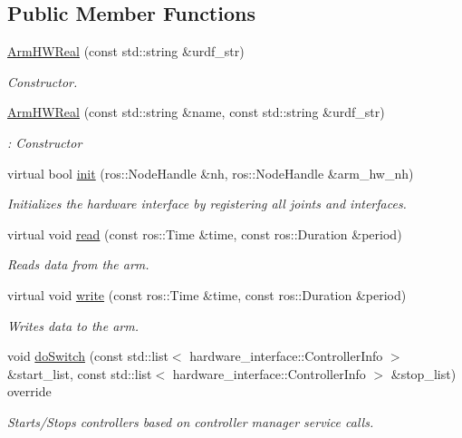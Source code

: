 \subsection*{Public Member Functions}
\begin{DoxyCompactItemize}
\item 
\hyperlink{classuwrt_1_1arm_1_1_arm_h_w_real_ad7edcfcf86fd221726402cbbf0f7a6d3}{Arm\+H\+W\+Real} (const std\+::string \&urdf\+\_\+str)
\begin{DoxyCompactList}\small\item\em Constructor. \end{DoxyCompactList}\item 
\hyperlink{classuwrt_1_1arm_1_1_arm_h_w_real_aa79a19f491094474cb91e6a07eecf0ee}{Arm\+H\+W\+Real} (const std\+::string \&name, const std\+::string \&urdf\+\_\+str)
\begin{DoxyCompactList}\small\item\em \+: Constructor \end{DoxyCompactList}\item 
virtual bool \hyperlink{classuwrt_1_1arm_1_1_arm_h_w_real_ab2556fef8e4666cb970113130e21a690}{init} (ros\+::\+Node\+Handle \&nh, ros\+::\+Node\+Handle \&arm\+\_\+hw\+\_\+nh)
\begin{DoxyCompactList}\small\item\em Initializes the hardware interface by registering all joints and interfaces. \end{DoxyCompactList}\item 
virtual void \hyperlink{classuwrt_1_1arm_1_1_arm_h_w_real_a7a4704f71c0652269a2e9c10907ca8b1}{read} (const ros\+::\+Time \&time, const ros\+::\+Duration \&period)
\begin{DoxyCompactList}\small\item\em Reads data from the arm. \end{DoxyCompactList}\item 
virtual void \hyperlink{classuwrt_1_1arm_1_1_arm_h_w_real_a25ab702964a8b1db7ea58b040189b820}{write} (const ros\+::\+Time \&time, const ros\+::\+Duration \&period)
\begin{DoxyCompactList}\small\item\em Writes data to the arm. \end{DoxyCompactList}\item 
void \hyperlink{classuwrt_1_1arm_1_1_arm_h_w_real_a5bc11742cda0b7826e45a12217c89965}{do\+Switch} (const std\+::list$<$ hardware\+\_\+interface\+::\+Controller\+Info $>$ \&start\+\_\+list, const std\+::list$<$ hardware\+\_\+interface\+::\+Controller\+Info $>$ \&stop\+\_\+list) override
\begin{DoxyCompactList}\small\item\em Starts/\+Stops controllers based on controller manager service calls. \end{DoxyCompactList}\end{DoxyCompactItemize}
